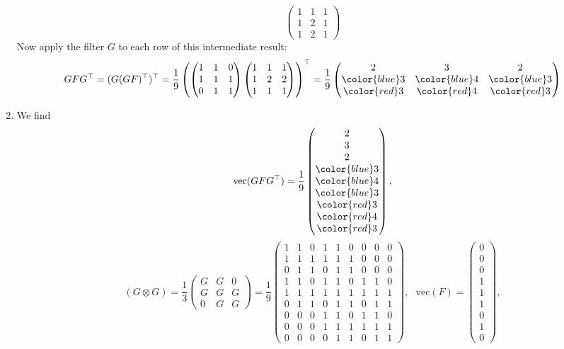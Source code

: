 \begin{enumerate}
$$\begin{pmatrix}
	1 & 1 & 1\\1 & 2 & 1\\ 1 & 2 & 1
	\end{pmatrix} 
	$$
	Now apply the filter $G$ to each row of this intermediate result:
	$$GFG^\top 
	=  (G (GF)^\top)^\top 
	= \frac{1}{9}\left(	
		\begin{pmatrix}
	1&1&0 \\
	1&1&1 \\
	0&1&1
	\end{pmatrix}
	\begin{pmatrix}
	1 & 1 & 1\\
	1 & 2 & 2\\ 
	1 & 1 & 1
	\end{pmatrix} 
	\right)^\top
		= 
		\frac{1}{9}
	\begin{pmatrix}
	2&3&2 \\
	\color{blue}3&\color{blue}4&\color{blue}3 \\
	\color{red}3&\color{red}4&\color{red}3
	\end{pmatrix}
	$$
	\item We find
	$$\text{vec}(G F G^\top) = 
		\frac{1}{9}
	\begin{pmatrix}
	 2\\3\\2\\\color{blue}3\\\color{blue}4\\\color{blue}3\\\color{red}3\\\color{red}4\\\color{red}3
	\end{pmatrix}
	, $$
	$$(G \otimes G)
	=\frac{1}{3} 	\begin{pmatrix}
	G&G&0 \\
	G&G&G\\
	0&G&G
	\end{pmatrix}
	=
	\frac{1}{9} 
	\begin{pmatrix}
		1&1&0&1&1&0&0&0&0\\
		1&1&1&1&1&1&0&0&0\\
		0&1&1&0&1&1&0&0&0\\
		1&1&0&1&1&0&1&1&0\\
		1&1&1&1&1&1&1&1&1\\
		0&1&1&0&1&1&0&1&1\\
		0&0&0&1&1&0&1&1&0\\
		0&0&0&1&1&1&1&1&1\\
		0&0&0&0&1&1&0&1&1
\end{pmatrix}
,~~~
	\text{vec}(F)
	=
		\begin{pmatrix}
	0\\0\\0\\1\\1\\1\\0\\1\\0
	\end{pmatrix},
	$$
	

\end{enumerate}
